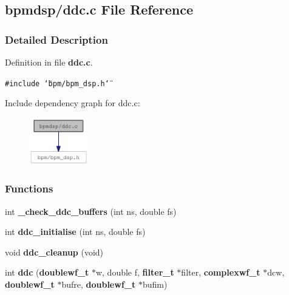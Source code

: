 \subsection{bpmdsp/ddc.c File Reference}
\label{ddc_8c}


\subsubsection{Detailed Description}


Definition in file {\bf ddc.c}.

{\tt \#include \char`\"{}bpm/bpm\_\-dsp.h\char`\"{}}\par


Include dependency graph for ddc.c:\nopagebreak
\begin{figure}[H]
\begin{center}
\leavevmode
\includegraphics[width=73pt]{ddc_8c__incl}
\end{center}
\end{figure}
\subsubsection*{Functions}
\begin{CompactItemize}
\item 
int \textbf{\_\-check\_\-ddc\_\-buffers} (int ns, double fs)\label{ddc_8c_f331a899b22b7631f27b5835ac6379f0}

\item 
int {\bf ddc\_\-initialise} (int ns, double fs)
\item 
void {\bf ddc\_\-cleanup} (void)
\item 
int {\bf ddc} ({\bf doublewf\_\-t} $\ast$w, double f, {\bf filter\_\-t} $\ast$filter, {\bf complexwf\_\-t} $\ast$dcw, {\bf doublewf\_\-t} $\ast$bufre, {\bf doublewf\_\-t} $\ast$bufim)
\end{CompactItemize}
